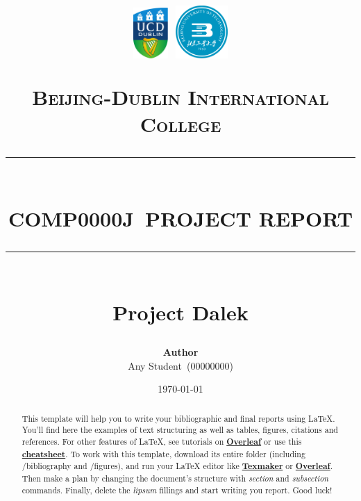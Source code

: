 \documentclass{article}
\newcommand{\name}{Any Student}
\newcommand{\idnumber}{00000000}
\newcommand{\coursecode}{COMP0000J}
\newcommand{\paperdate}{\today}
\newcommand{\HRule}[1]{\rule{\linewidth}{#1}}
\begin{document}


\title{ \normalsize  \includegraphics[width=0.1\textwidth]{images/UCD_Logo.pdf} \textbf{ }
\includegraphics[width=0.15\textwidth]{images/BJUT_Logo.pdf} \par \textsc{Beijing-Dublin International College}
		\\ [2.0cm]
		\HRule{1.5pt} \\ [0.35cm]
		\LARGE \textbf{\uppercase{\coursecode \ Project Report}}
		\HRule{1.5pt} \\ [0.9cm] \textbf{\LARGE{Project Dalek}} \vspace*{10\baselineskip}
		}
\date{\paperdate}
\author{\textbf{Author} \\ 
    \name \ (\idnumber) \\
}

\maketitle
\newpage

\tableofcontents
\newpage



\begin{abstract}
    This template will help you to write your bibliographic and final reports using \LaTeX{}. You'll find here the examples of text structuring as well as tables, figures, citations and references. For other features of \LaTeX, see tutorials on \href{https://www.overleaf.com/learn}{\textbf{Overleaf}} or use this \href{https://wch.github.io/latexsheet/}{\textbf{cheatsheet}}. To work with this template, download its entire folder (including /bibliography and /figures), and run your \LaTeX{}  editor like \href{http://www.xm1math.net/texmaker/}{\textbf{Texmaker}} or \href{https://www.overleaf.com}{\textbf{Overleaf}}. Then make a plan by changing the document's structure with \textit{section} and \textit{subsection} commands. Finally, delete the \textit{lipsum} fillings and start writing you report. Good luck!
\end{abstract}
\end{document}

